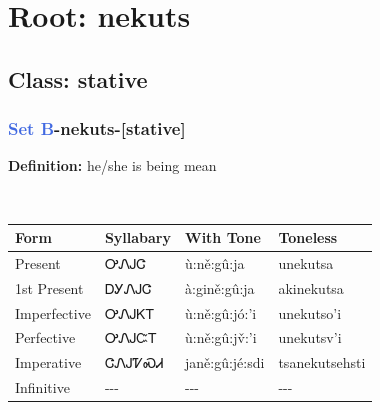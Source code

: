 \needspace{4in}
\section*{Root: nekuts}
\nopagebreak
{}
\needspace{3in}
\subsection*{Class: stative}
\nopagebreak
\needspace{2in}
\subsubsection*{\textcolor{RoyalBlue}{Set B}{-}\textbf{nekuts}{-}[stative]}
\nopagebreak
\textbf{Definition: } he/she is being mean
\\[0.5em]
\begin{tabularx}{\textwidth}{l X X X}%
\toprule%
\textbf{Form}&\textbf{Syllabary}&\textbf{With Tone}&\textbf{Toneless}\\%
\midrule%
Present&ᎤᏁᎫᏣ&ù:ně:gû:ja&unekutsa\\%
1st Present&ᎠᎩᏁᎫᏣ&à:gině:gû:ja&akinekutsa\\%
Imperfective&ᎤᏁᎫᏦᎢ&ù:ně:gû:jó:’i&unekutso'i\\%
Perfective&ᎤᏁᎫᏨᎢ&ù:ně:gû:jv̌:’i&unekutsv'i\\%
Imperative&ᏣᏁᎫᏤᏍᏗ&janě:gû:jé:sdi&tsanekutsehsti\\%
Infinitive&{-}{-}{-}&{-}{-}{-}&{-}{-}{-}\\%
\bottomrule%
\end{tabularx}
\\[1em]
